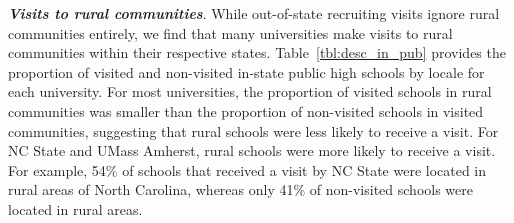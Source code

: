 \documentclass[twoside]{article}
\begin{document}
\textbf{\textit{Visits to rural communities}}. While out-of-state recruiting visits ignore rural communities entirely, we find that many universities make visits to rural communities within their respective states. Table~\ref{tbl:desc_in_pub} provides the proportion of visited and non-visited in-state public high schools by locale for each university. For most universities, the proportion of visited schools in rural communities was smaller than the proportion of non-visited schools in visited communities, suggesting that rural schools were less likely to receive a visit.  For NC State and UMass Amherst, rural schools were more likely to receive a visit. For example, 54\% of schools that received a visit by NC State were located in rural areas of North Carolina, whereas only 41\% of non-visited schools were located in rural areas.
\end{document}
